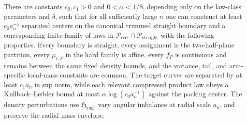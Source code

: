 There are constants \(c_0,c_1>0\) and \(0<\alpha<1/8\), depending only on the law-class parameters and \(\delta\), such that for all sufficiently large \(n\) one can construct at least \(c_0a_n^{-1}\) separated centers on the canonical trimmed straight boundary and a corresponding finite family of laws in \(\mathcal{P}_{\mathrm{rect}}\cap\mathcal{P}_{\mathrm{straight}}\) with the following properties. Every boundary is straight, every assignment is the two-half-plane partition, every \(\mu_{t,P}\) in the hard family is affine, every \(f_P\) is continuous and remains between the same fixed density bounds, and the variance, tail, and arm-specific local-mass constants are common. The target curves are separated by at least \(c_1a_n\) in sup norm, while each relevant compressed product law obeys a Kullback--Leibler bound at most \(\alpha\log(c_0a_n^{-1})\) against the packing center. The density perturbations use \(\mathfrak{H}_{\mathrm{ang}}\), vary angular imbalance at radial scale \(a_n\), and preserve the radial mass envelope.